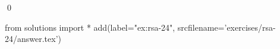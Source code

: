 
\begin{ex} 
  \label{ex:rsa-24}
  
  \qed
\end{ex} 
\begin{python0}
from solutions import *
add(label="ex:rsa-24",
    srcfilename='exercises/rsa-24/answer.tex') 
\end{python0}
